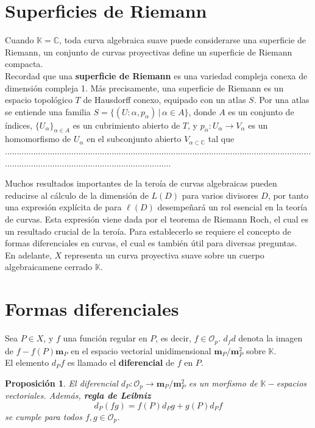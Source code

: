 \documentclass[12pt,a4paper]{report}
\newcommand{\msp}{\mathbf{m}_{P}}
\newcommand{\Op}{\mathscr{O}_{p}}
\newcommand{\K}{\mathbb{K}}
\newcommand{\C}{\mathbb{C}}
\newtheorem{prop}{Proposición}[chapter]
\begin{document}
\section{Superficies de Riemann}

Cuando $\K = \C$, toda curva algebraica suave puede considerarse una superficie de Riemann, un conjunto de curvas proyectivas define un superficie de Riemann compacta.\\
Recordad que una \textbf{superficie de Riemann} es una variedad compleja conexa de dimensión compleja 1. Más precisamente, una superficie de Riemann es un espacio topológico $T$ de Hausdorff conexo, equipado con un atlas $S$. Por una atlas se entiende una familia $S= \{ (U:{\alpha} , p_{\alpha}) \, | \, \alpha \in A \}$, donde $A$ es un conjunto de índices, $\{U_{\alpha}\} _{\alpha \in A}$ es un cubrimiento abierto de $T$, y $p_\alpha : U_{\alpha} \rightarrow V_{\alpha} $ es un homomorfismo de $U_{\alpha}$ en el subconjunto abierto $V_{\alpha \subset \C}$ tal que
.......................................................................................................................................................................................................

Muchos resultados importantes de la teroía de curvas algebraicas pueden reducirse al cálculo de la dimensión de $L(D)$ para varios divisores $D$, por tanto una expresión explícita de para $\ell (D)$ desempeñará un rol esencial en la teoría de curvas. Esta expresión viene dada por el teorema de Riemann Roch, el cual es un resultado crucial de la teroía. Para establecerlo se requiere el concepto de formas diferenciales en curvas, el cual es también útil para diversas preguntas.\\
En adelante, $X$ representa un curva proyectiva suave sobre un cuerpo algebraicamene cerrado $\K$.

\section{Formas diferenciales}
Sea $P \in X$, y $f$ una función regular en $P$, es decir, $f \in \Op$. $d_{f}d$ denota la imagen de $f-f(P) \mathbf{m}_{P}$ en el espacio vectorial unidimensional $\msp/ \msp ^{2}$ sobre $\K$.\\
El elemento $d_{P}f$ es llamado el \textbf{diferencial} de $f$ en $P.$

\begin{prop}
	El diferencial $d_{P}: \Op \rightarrow \msp/ \msp ^{2} $ es un morfismo de $\K-$espacios vectoriales. Además, \textbf{regla de Leibniz} $$ d_{P}(fg)= f(P)d_{P}g + g(P)d_{P}f $$ se cumple para todos $f,g \in \Op$.
\end{prop}
\end{document}
